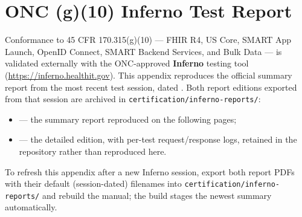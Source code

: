 \chapter{ONC (g)(10) Inferno Test Report}
\label{chap:inferno-report}


Conformance to 45 CFR \textsection{} 170.315(g)(10) --- FHIR R4, US Core,
SMART App Launch, OpenID Connect, SMART Backend Services, and Bulk Data ---
is validated externally with the ONC-approved \textbf{Inferno} testing tool
(\url{https://inferno.healthit.gov}). This appendix reproduces the official
summary report from the most recent test session, dated
\textbf{\InfernoReportDate}. Both report editions exported from that session
are archived in \texttt{certification/inferno-reports/}:

\begin{itemize}
  \item \texttt{\InfernoReportSourceFile} --- the summary report reproduced
        on the following pages;
  \item \texttt{\InfernoDetailedSourceFile} --- the detailed edition, with
        per-test request/response logs, retained in the repository rather
        than reproduced here.
\end{itemize}

To refresh this appendix after a new Inferno session, export both report
PDFs with their default (session-dated) filenames into
\texttt{certification/inferno-reports/} and rebuild the manual; the build
stages the newest summary automatically.

